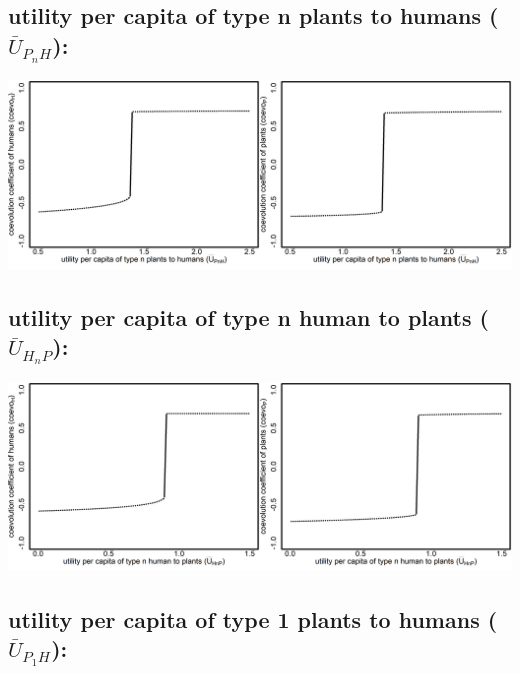 \documentclass[
]{book}
\begin{document}
\hypertarget{utility-per-capita-of-type-n-plants-to-humans-baru_p_nh-1}{%
\subsection{\texorpdfstring{utility per capita \textbf{of} type n plants \textbf{to} humans (\(\bar{U}_{P_{n}H}\)):}{utility per capita of type n plants to humans (\textbackslash bar\{U\}\_\{P\_\{n\}H\}):}}\label{utility-per-capita-of-type-n-plants-to-humans-baru_p_nh-1}}

\includegraphics[width=1\linewidth]{plots/2_exp_utility_per_capita_type_n_plants_to_humans_bifurcationPlotPair}

\hypertarget{utility-per-capita-of-type-n-human-to-plants-baru_h_np}{%
\subsection{\texorpdfstring{utility per capita \textbf{of} type n human \textbf{to} plants (\(\bar{U}_{H_{n}P}\)):}{utility per capita of type n human to plants (\textbackslash bar\{U\}\_\{H\_\{n\}P\}):}}\label{utility-per-capita-of-type-n-human-to-plants-baru_h_np}}

\includegraphics[width=1\linewidth]{plots/2_exp_utility_per_capita_type_n_humans_to_plants_bifurcationPlotPair}

\hypertarget{utility-per-capita-of-type-1-plants-to-humans-baru_p_1h}{%
\subsection{\texorpdfstring{utility per capita \textbf{of} type 1 plants \textbf{to} humans (\(\bar{U}_{P_{1}H}\)):}{utility per capita of type 1 plants to humans (\textbackslash bar\{U\}\_\{P\_\{1\}H\}):}}\label{utility-per-capita-of-type-1-plants-to-humans-baru_p_1h}}
\end{document}
